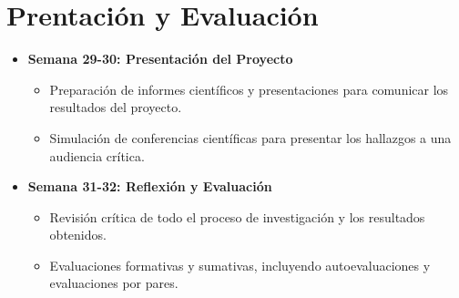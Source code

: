 \section{Prentación y Evaluación}
\begin{itemize}
  \item \textbf{Semana 29-30: Presentación del Proyecto}
  \begin{itemize}
    \item Preparación de informes científicos y presentaciones para comunicar los resultados del proyecto.
    \item Simulación de conferencias científicas para presentar los hallazgos a una audiencia crítica.
  \end{itemize}
  \item \textbf{Semana 31-32: Reflexión y Evaluación}
  \begin{itemize}
    \item Revisión crítica de todo el proceso de investigación y los resultados obtenidos.
    \item Evaluaciones formativas y sumativas, incluyendo autoevaluaciones y evaluaciones por pares.
  \end{itemize}
\end{itemize}

